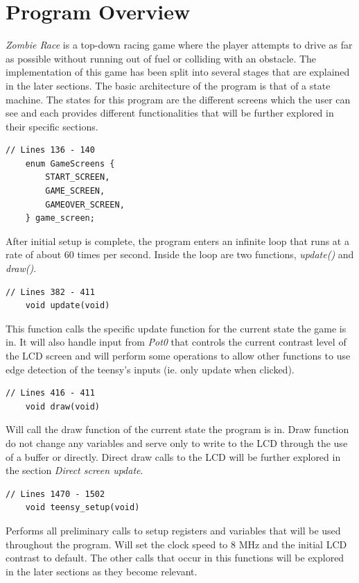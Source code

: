 \documentclass{article}
\begin{document}
\section{Program Overview}
\emph{Zombie Race} is a top-down racing game where the player attempts to drive as far as possible without running out of fuel or colliding with an obstacle. The implementation of this game has been split into several stages that are explained in the later sections. 
\newline
\newline
The basic architecture of the program is that of a state machine. The states for this program are the different screens which the user can see and each provides different functionalities that will be further explored in their specific sections. 
\begin{lstlisting}[style=CStyle]
	// Lines 136 - 140
	enum GameScreens {
		START_SCREEN,
		GAME_SCREEN,
		GAMEOVER_SCREEN,
	} game_screen;
\end{lstlisting}
After initial setup is complete, the program enters an infinite loop that runs at a rate of about 60 times per second. Inside the loop are two functions, \emph{update()} and \emph{draw()}.
\begin{lstlisting}[style=CStyle]
	// Lines 382 - 411
	void update(void)
\end{lstlisting}
This function calls the specific update function for the current state the game is in. It will also handle input from \emph{Pot0} that controls the current contrast level of the LCD screen and will perform some operations to allow other functions to use edge detection of the teensy's inputs (ie. only update when clicked). 
\begin{lstlisting}[style=CStyle]
	// Lines 416 - 411
	void draw(void)
\end{lstlisting}
Will call the draw function of the current state the program is in. Draw function do not change any variables and serve only to write to the LCD through the use of a buffer or directly. Direct draw calls to the LCD will be further explored in the section \emph{Direct screen update}. 
\begin{lstlisting}[style=CStyle]
	// Lines 1470 - 1502
	void teensy_setup(void)
\end{lstlisting}
Performs all preliminary calls to setup registers and variables that will be used throughout the program. Will set the clock speed to 8 MHz and the initial LCD contrast to default. The other calls that occur in this functions will be explored in the later sections as they become relevant. 
\clearpage
\end{document}
